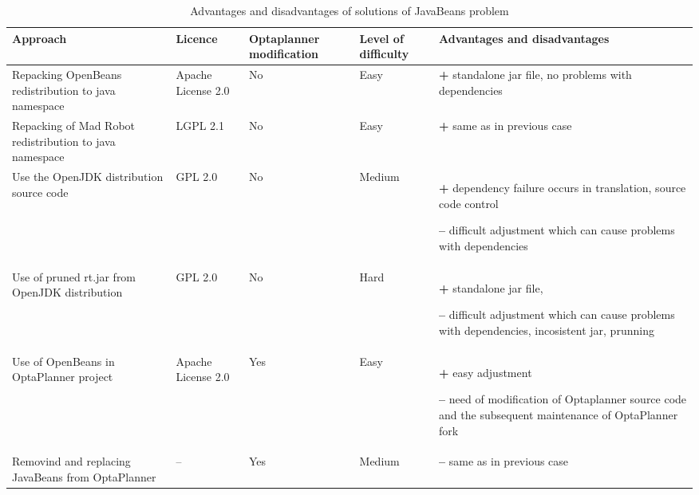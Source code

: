 \begin {table}[h!]
\begin{tabular}{|p{2.5cm}|p{2cm}|p{2.4cm}|p{2.1cm}|p{5cm}|}
\hline
{\bf Approach} & {\bf Licence} & {\bf Optaplanner modification} & {\bf Level of difficulty} & {\bf Advantages and disadvantages} \\
\hline \hline
    Repacking OpenBeans redistribution to java namespace & Apache License 2.0 & No & Easy & 
    {\bf +} standalone jar file, no problems with dependencies \\
    \hline
    Repacking of Mad Robot redistribution to java namespace & LGPL 2.1 & No & Easy &
    {\bf +} same as in previous case \\
\hline
    Use the OpenJDK distribution source code &  GPL 2.0 & No & Medium &
    {\bf +} dependency failure occurs in translation, source code control

    {\bf --} difficult adjustment which can cause problems with dependencies \\
\hline
    Use of pruned rt.jar from OpenJDK distribution & GPL 2.0  & No & Hard &
    {\bf +} standalone jar file, 

    {\bf --}
    difficult adjustment which can cause problems with dependencies, incosistent jar, prunning \\
\hline
    Use of OpenBeans in OptaPlanner project & Apache License 2.0 & Yes & Easy &
    {\bf +} easy adjustment

    {\bf --} need of modification of Optaplanner source code and the subsequent maintenance of OptaPlanner fork \\
\hline
    Removind and replacing JavaBeans from OptaPlanner & -- & Yes & Medium &
    {\bf --} same as in previous case\\
\hline
\end{tabular}
\centering
\caption{Advantages and disadvantages of solutions of JavaBeans problem}
\label{advDis}
\end{table}



